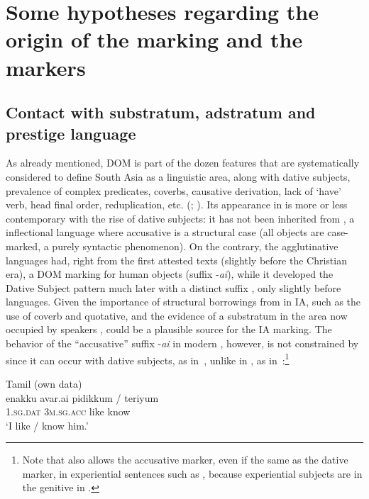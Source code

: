\documentclass[output=paper]{LSP/langsci}
\begin{document}
\section{Some hypotheses regarding the origin of the marking and the markers}
\label{10-mo-sec:6}

\subsection{Contact with substratum, adstratum and prestige language}
\label{10-mo-sec:6.1}

As already mentioned, DOM is part of the dozen features that are systematically considered to define South Asia as a linguistic area, along with dative subjects, prevalence of complex predicates, coverbs, causative derivation, lack of ‘have’ verb, head final order, reduplication, etc. (\citealt{Masica1976Defining}; \citealt{Emeneau1980Language}). Its appearance in  is more or less contemporary with the rise of dative subjects: it has not been inherited from , a inflectional language where accusative is a structural case (all objects are case-marked, a purely syntactic phenomenon). On the contrary, the agglutinative  languages had, right from the first attested texts (slightly before the Christian era), a DOM marking for human objects (suffix {}-\textit{ai}), while it developed the Dative Subject pattern much later with a distinct suffix \citep{Murugaiyan2004Note}, only slightly before  languages. Given the importance of structural borrowings from  in IA, such as the use of coverb and quotative, and the evidence of a  substratum in the area now occupied by  speakers \citep{Witzel1995Early},  could be a plausible source for the IA marking. The behavior of the “accusative” suffix \nobreakdash-\textit{ai} in modern , however, is not constrained by  since it can occur with dative subjects, as in~, unlike in , as in~:\footnote{Note that  also allows the accusative marker, even if the same as the dative marker, in experiential sentences such as  , because experiential subjects are in the genitive in .} 

\ea Tamil (own data)\label{10-mo-ex:56}\\
\gll enakku avar.ai pidikkum / teriyum\\
\textsc{1.sg.dat} \textsc{3m.sg.acc} like { }  know\\
\glt ‘I like / know him.’
\z
\end{document}
